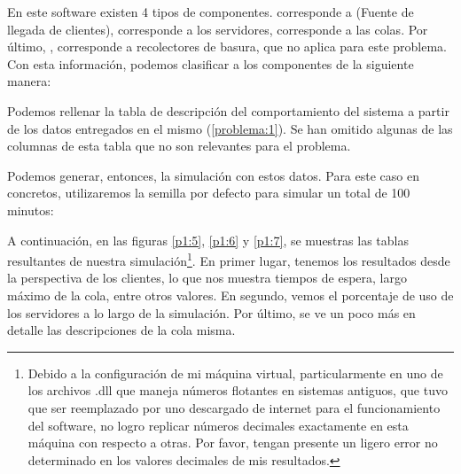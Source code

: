 
En este software existen 4 tipos de componentes.  corresponde a  (Fuente de llegada de clientes),  corresponde a los servidores,  corresponde a las colas. Por último, , corresponde a recolectores de basura, que no aplica para este problema. Con esta información, podemos clasificar a los componentes de la siguiente manera:

Podemos rellenar la tabla de descripción del comportamiento del sistema a partir de los datos entregados en el mismo (\ref{problema:1}). Se han omitido algunas de las columnas de esta tabla que no son relevantes para el problema.

Podemos generar, entonces, la simulación con estos datos. Para este caso en concretos, utilizaremos la semilla por defecto para simular un total de 100 minutos:

\clearpage
A continuación, en las figuras \ref{p1:5}, \ref{p1:6} y \ref{p1:7}, se muestras las tablas resultantes de nuestra simulación\footnote{Debido a la configuración de mi máquina virtual, particularmente en uno de los archivos .dll que maneja números flotantes en sistemas antiguos, que tuvo que ser reemplazado por uno descargado de internet para el funcionamiento del software, no logro replicar números decimales exactamente en esta máquina con respecto a otras. Por favor, tengan presente un ligero error no determinado en los valores decimales de mis resultados.}. En primer lugar, tenemos los resultados desde la perspectiva de los clientes, lo que nos muestra tiempos de espera, largo máximo de la cola, entre otros valores. En segundo, vemos el porcentaje de uso de los servidores a lo largo de la simulación. Por último, se ve un poco más en detalle las descripciones de la cola misma.

